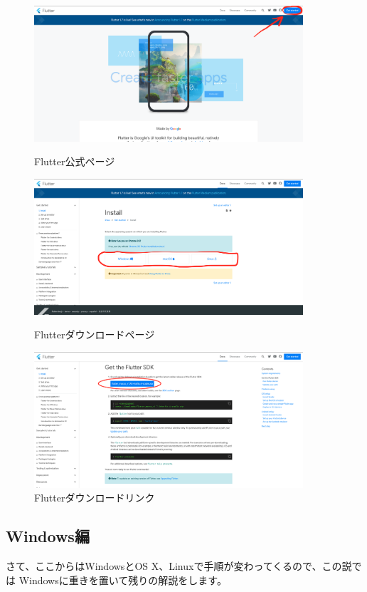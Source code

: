 \documentclass{jsarticle}
\begin{document}
            \begin{figure}[ht]
                \centering
                \includegraphics[width=10cm]{images/flutter_main_page.png}
                \caption{Flutter公式ページ}
                \label{fig:flutter_main_page}

                \includegraphics[width=10cm]{images/flutter_download_page.png}
                \caption{Flutterダウンロードページ}
                \label{fig:flutter_download_page}

                \includegraphics[width=10cm]{images/flutter_download_link.png}
                \caption{Flutterダウンロードリンク}
                \label{fig:flutter_download_link}
            \end{figure}

        \subsection*{Windows編}
            さて、ここからはWindowsとOS X、Linuxで手順が変わってくるので、この説では
            Windowsに重きを置いて残りの解説をします。
\end{document}
